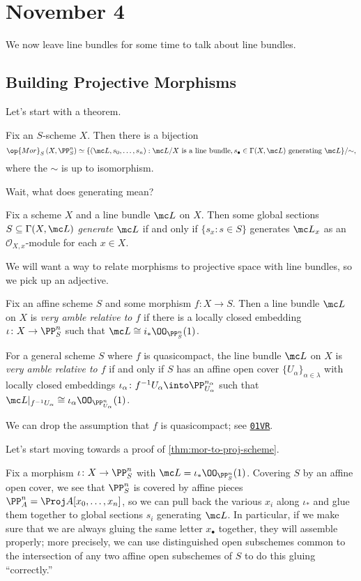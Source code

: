 \documentclass[../notes.tex]{subfiles}
\begin{document}
\section{November 4}

We now leave line bundles for some time to talk about line bundles.

\subsection{Building Projective Morphisms}
Let's start with a theorem.
\begin{theorem} \label{thm:mor-to-proj-scheme}
	Fix an $S$-scheme $X$. Then there is a bijection
	\[\op{Mor}_S\left(X,\PP^n_S\right)\simeq\{(\mc L,s_0,\ldots,s_n):\mc L/X\text{ is a line bundle},s_\bullet\in\Gamma(X,\mc L)\text{ generating }\mc L\}/{\sim},\]
	where the $\sim$ is up to isomorphism.
\end{theorem}
Wait, what does generating mean?
\begin{definition}
	Fix a scheme $X$ and a line bundle $\mc L$ on $X$. Then some global sections $S\subseteq\Gamma(X,\mc L)$ \textit{generate $\mc L$} if and only if $\{s_x:s\in S\}$ generates $\mc L_x$ as an $\mathcal O_{X,x}$-module for each $x\in X$.
\end{definition}
We will want a way to relate morphisms to projective space with line bundles, so we pick up an adjective.
\begin{definition}
	Fix an affine scheme $S$ and some morphism $f\colon X\to S$. Then a line bundle $\mc L$ on $X$ is \textit{very amble relative to $f$} if there is a locally closed embedding $\iota\colon X\to\PP^n_S$ such that $\mc L\cong i_*\OO_{\PP^n_S}(1)$.
	
	For a general scheme $S$ where $f$ is quasicompact, the line bundle $\mc L$ on $X$ is \textit{very amble relative to $f$} if and only if $S$ has an affine open cover $\{U_\alpha\}_{\alpha\in\lambda}$ with locally closed embeddings $\iota_\alpha\colon f^{-1}U_\alpha\into\PP^{n_\alpha}_{U_\alpha}$ such that $\mc L|_{f^{-1}U_\alpha}\cong\iota_\alpha\OO_{\PP^n_{U_\alpha}}(1)$.
\end{definition}
\begin{remark}
	We can drop the assumption that $f$ is quasicompact; see \href{https://stacks.math.columbia.edu/tag/01VR}{\texttt{01VR}}.
\end{remark}
Let's start moving towards a proof of \autoref{thm:mor-to-proj-scheme}.
\begin{ex} \label{ex:get-line-bundle-generators}
	Fix a morphism $\iota\colon X\to\PP^n_S$ with $\mc L=\iota_*\OO_{\PP^n_S}(1)$. Covering $S$ by an affine open cover, we see that $\PP^n_S$ is covered by affine pieces $\PP^n_A=\Proj A[x_0,\ldots,x_n]$, so we can pull back the various $x_i$ along $\iota_*$ and glue them together to global sections $s_i$ generating $\mc L$. In particular, if we make sure that we are always gluing the same letter $x_\bullet$ together, they will assemble properly; more precisely, we can use distinguished open subschemes common to the intersection of any two affine open subschemes of $S$ to do this gluing ``correctly.''
\end{ex}
\end{document}
